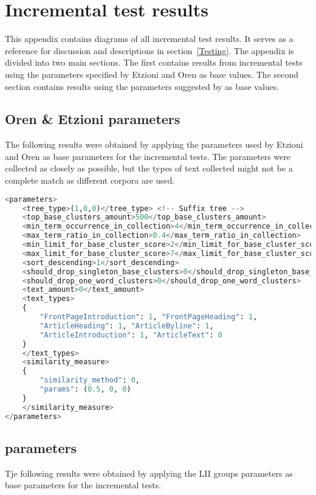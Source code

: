 
\chapter{Incremental test results} %

\label{AppendixA} %


This appendix contains diagrams of all incremental test results. It serves as a reference for discussion and descriptions in section~\ref{Testing}. The appendix is divided into two main sections. The first contains results from incremental tests using the parameters specified by Etzioni and Oren as base values. The second section contains results using the parameters suggested by \supervisor as base values.

\section{Oren \& Etzioni parameters}

The following results were obtained by applying the parameters used by Etzioni and Oren as base parameters for the incremental tests. The parameters were collected as closely as possible, but the types of text collected might not be a complete match as different corpora are used.

\begin{lstlisting}[float=t, language=python, label=lst:etzioniparams, caption={Parameter set used in Oren and Etzioni.}]
<parameters>
    <tree_type>(1,0,0)</tree_type> <!-- Suffix tree -->
    <top_base_clusters_amount>500</top_base_clusters_amount>
    <min_term_occurrence_in_collection>4</min_term_occurrence_in_collection>
    <max_term_ratio_in_collection>0.4</max_term_ratio_in_collection>
    <min_limit_for_base_cluster_score>2</min_limit_for_base_cluster_score>
    <max_limit_for_base_cluster_score>7</max_limit_for_base_cluster_score>
    <sort_descending>1</sort_descending>
    <should_drop_singleton_base_clusters>0</should_drop_singleton_base_clusters>
    <should_drop_one_word_clusters>0</should_drop_one_word_clusters>
    <text_amount>0</text_amount>
    <text_types>
    {
    	"FrontPageIntroduction": 1, "FrontPageHeading": 1,
    	"ArticleHeading": 1, "ArticleByline": 1,
    	"ArticleIntroduction": 1, "ArticleText": 0
    }
    </text_types>
    <similarity_measure>
    {
    	"similarity_method": 0,
    	"params": (0.5, 0, 0)
    }
   	</similarity_measure>
</parameters>
\end{lstlisting}



\section{\supervisor parameters}

Tje following results were obtained by applying the LII groups parameters as base parameters for the incremental tests.

